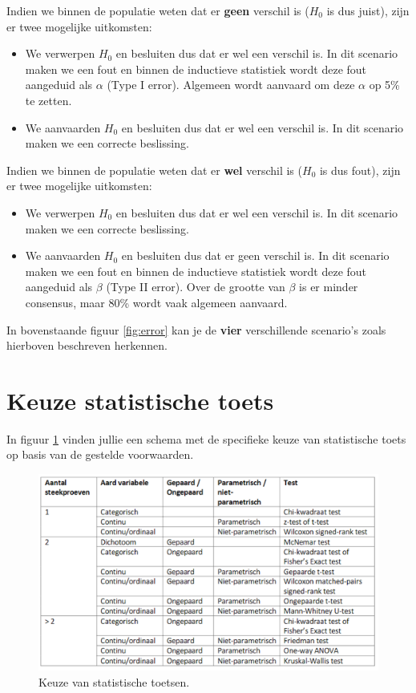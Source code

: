 \documentclass[
]{book}
\providecommand{\tightlist}{%
  \setlength{\itemsep}{0pt}\setlength{\parskip}{0pt}}
\theoremstyle{definition}
\theoremstyle{definition}
\theoremstyle{definition}
\theoremstyle{definition}
\theoremstyle{remark}
\begin{document}
Indien we binnen de populatie weten dat er \textbf{geen} verschil is (\(H_0\) is dus juist), zijn er twee mogelijke uitkomsten:

\begin{itemize}
\tightlist
\item
  We verwerpen \(H_0\) en besluiten dus dat er wel een verschil is. In dit scenario maken we een fout en binnen de inductieve statistiek wordt deze fout aangeduid als \(\alpha\) (Type I error). Algemeen wordt aanvaard om deze \(\alpha\) op 5\% te zetten.
\item
  We aanvaarden \(H_0\) en besluiten dus dat er wel een verschil is. In dit scenario maken we een correcte beslissing.
\end{itemize}

Indien we binnen de populatie weten dat er \textbf{wel} verschil is (\(H_0\) is dus fout), zijn er twee mogelijke uitkomsten:

\begin{itemize}
\tightlist
\item
  We verwerpen \(H_0\) en besluiten dus dat er wel een verschil is. In dit scenario maken we een correcte beslissing.
\item
  We aanvaarden \(H_0\) en besluiten dus dat er geen verschil is. In dit scenario maken we een fout en binnen de inductieve statistiek wordt deze fout aangeduid als \(\beta\) (Type II error). Over de grootte van \(\beta\) is er minder consensus, maar 80\% wordt vaak algemeen aanvaard.
\end{itemize}

In bovenstaande figuur \ref{fig:error} kan je de \textbf{vier} verschillende scenario's zoals hierboven beschreven herkennen.

\hypertarget{keuze-statistische-toets}{%
\section*{Keuze statistische toets}\label{keuze-statistische-toets}}


In figuur \ref{fig:stattest} vinden jullie een schema met de specifieke keuze van statistische toets op basis van de gestelde voorwaarden.

\begin{figure}
\includegraphics[width=1\linewidth]{img/stat_test} \caption{Keuze van statistische toetsen.}\label{fig:stattest}
\end{figure}
\end{document}
